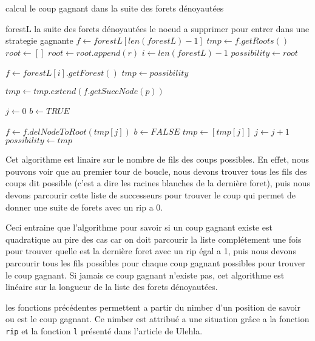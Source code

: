 \begin{algorithm}[hbt]
  \caption{calcul le coup gagnant dans la suite des forets dénoyautées}
  \begin{algorithmic}
    \REQUIRE forestL la suite des forets dénoyautées
    \ENSURE le noeud a supprimer pour entrer dans une strategie gagnante
    \STATE $f \leftarrow forestL[len(forestL) - 1]$
    \STATE $tmp \leftarrow f.getRoots()$
    \STATE $root \leftarrow []$
          \STATE $root \leftarrow root.append(r)$
        \ENDIF
    \ENDFOR
    \STATE $i \leftarrow len(forestL) - 1$
    \STATE $possibility \leftarrow root$

      \STATE $f \leftarrow forestL[i].getForest()$
      \STATE $tmp \leftarrow possibility$

        \STATE $tmp \leftarrow tmp.extend(f.getSuccNode(p))$
      \ENDFOR

      \STATE $j \leftarrow 0$
      \STATE $b \leftarrow TRUE$

        \STATE $f \leftarrow f.delNodeToRoot(tmp[j])$
          \STATE $b \leftarrow FALSE$
          \STATE $tmp \leftarrow [tmp[j]]$
        \ENDIF
        \STATE $j \leftarrow j + 1$
      \ENDWHILE
      \STATE $possibility \leftarrow tmp$
    \ENDWHILE
  \end{algorithmic}
\end{algorithm}

Cet algorithme est linaire sur le nombre de fils des coups possibles. En effet, nous pouvons voir que au premier tour de boucle, nous devons trouver tous les fils des coups dit possible (c'est a dire les racines blanches de la dernière foret), puis nous devons parcourir cette liste de successeurs pour trouver le coup qui permet de donner une suite de forets avec un rip a 0.

Ceci entraine que l'algorithme pour savoir si un coup gagnant existe est quadratique au pire des cas car on doit parcourir la liste complétement une fois pour trouver quelle est la dernière foret avec un rip égal a 1, puis nous devons parcourir tous les fils possibles pour chaque coup gagnant possibles pour trouver le coup gagnant. Si jamais ce coup gagnant n'existe pas, cet algorithme est linéaire sur la longueur de la liste des forets dénoyautées.

les fonctions précédentes permettent a partir du nimber d'un position de savoir ou est le coup gagnant. Ce nimber est attribué a une situation grâce a la fonction \texttt{rip} et la fonction \texttt{l} présenté dans l'article de Ulehla.

